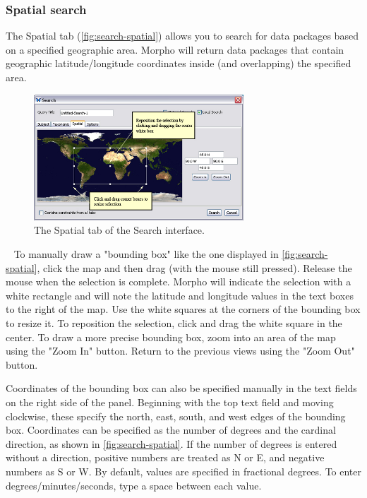 \subsubsection[Spatial]{Spatial search} \label{sec:search-spatial}

The Spatial tab (\autoref{fig:search-spatial}) allows you to search for data packages
based on a specified geographic area. Morpho will return data packages
that contain geographic latitude/longitude coordinates inside (and
overlapping) the specified area.

\begin{figure}
  \centering
    \includegraphics[width=0.7\textwidth]{images/search-spatial.jpg}
  \caption{The Spatial tab of the Search interface.}
  \label{fig:search-spatial}
\end{figure}
 
To manually draw a "bounding box" like the one displayed in
\autoref{fig:search-spatial}, click the map and then drag (with the
mouse still pressed). Release the mouse when the selection is complete.
Morpho will indicate the selection with a white rectangle and will note
the latitude and longitude values in the text boxes to the right of the
map. Use the white squares at the corners of the bounding box to resize
it. To reposition the selection, click and drag the white square in the
center.  To draw a more precise bounding box, zoom into an area of the
map using the "Zoom In" button. Return to the previous views using the
"Zoom Out" button. 

Coordinates of the bounding box can also be specified manually in the
text fields on the right side of the panel. Beginning with the top text
field and moving clockwise, these specify the north, east, south, and
west edges of the bounding box. Coordinates can be specified as the
number of degrees and the cardinal direction, as shown in
\autoref{fig:search-spatial}. If the number of degrees is entered
without a direction, positive numbers are treated as N or E, and
negative numbers as S or W. By default, values are specified in
fractional degrees. To enter degrees/minutes/seconds, type a space
between each value.

